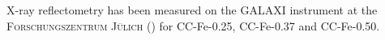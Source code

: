 \documentclass[\main/dresen_thesis.tex]{subfiles}
\begin{document}

    X-ray reflectometry has been measured on the GALAXI instrument at the \textsc{Forschungszentrum J\"ulich} () for CC-Fe-0.25, CC-Fe-0.37 and CC-Fe-0.50.
\end{document}
